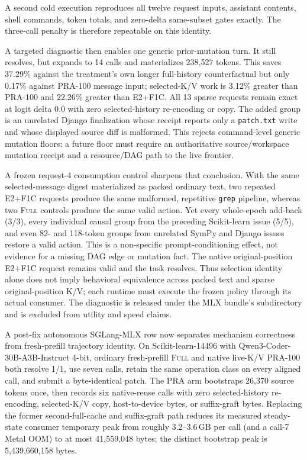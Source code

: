 \documentclass[11pt]{article}
\begin{document}
A second cold execution reproduces all twelve request inputs, assistant
contents, shell commands, token totals, and zero-delta same-subset gates
exactly.  The three-call penalty is therefore repeatable on this identity.

A targeted diagnostic then enables one generic prior-mutation turn.  It still
resolves, but expands to 14 calls and materializes 238,527 tokens.  This saves
37.29\% against the treatment's own longer full-history counterfactual but only
0.17\% against PRA-100 message input; selected-K/V work is 3.12\% greater than
PRA-100 and 22.26\% greater than E2+F1C.  All 13 sparse requests remain exact
at logit delta 0.0 with zero selected-history re-encoding or copy.  The added
group is an unrelated Django finalization whose receipt reports only a
\texttt{patch.txt} write and whose displayed source diff is malformed.  This
rejects command-level generic mutation floors: a future floor must require an
authoritative source/workspace mutation receipt and a resource/DAG path to the
live frontier.

A frozen request-4 consumption control sharpens that conclusion.  With the
same selected-message digest materialized as packed ordinary text, two
repeated E2+F1C requests produce the same malformed, repetitive
\texttt{grep} pipeline, whereas two \textsc{Full} controls produce the same valid
action.  Yet every whole-epoch add-back (3/3), every individual causal group
from the preceding Scikit-learn issue (5/5), and even 82- and 118-token groups
from unrelated SymPy and Django issues restore a valid action.  This is a
non-specific prompt-conditioning effect, not evidence for a missing DAG edge
or mutation fact.  The native original-position E2+F1C request remains valid
and the task resolves.  Thus selection identity alone does not imply
behavioral equivalence across packed text and sparse original-position K/V;
each runtime must execute the frozen policy through its actual consumer.  The
diagnostic is released under the MLX bundle's
 subdirectory and is excluded from utility and
speed claims.

A post-fix autonomous SGLang-MLX row now separates mechanism correctness from
fresh-prefill trajectory identity.  On Scikit-learn-14496 with
Qwen3-Coder-30B-A3B-Instruct 4-bit, ordinary fresh-prefill \textsc{Full} and
native live-K/V PRA-100 both resolve 1/1, use seven calls, retain the same
operation class on every aligned call, and submit a byte-identical patch.  The
PRA arm bootstraps 26,370 source tokens once, then records six native-reuse
calls with zero selected-history re-encoding, selected-K/V copy, host-to-device
bytes, or suffix-graft bytes.  Replacing the former second-full-cache and
suffix-graft path reduces its measured steady-state consumer temporary peak
from roughly 3.2--3.6\,GB per call (and a call-7 Metal OOM) to at most
41,559,048 bytes; the distinct bootstrap peak is 5,439,660,158 bytes.
\end{document}
